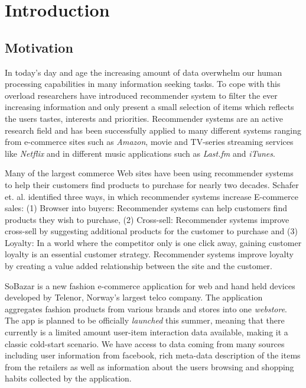 
\chapter{Introduction}
\minitoc
\setcounter{page}{1}

\clearpage

\section{Motivation}


In today's day and age the increasing amount of data overwhelm our human processing capabilities in many information seeking tasks. To cope with this overload researchers have introduced recommender system to filter the ever increasing information and only present a small selection of items which reflects the users tastes, interests and priorities. Recommender systems are an active research field and has been successfully applied to many different systems ranging from e-commerce sites such as \emph{Amazon}, movie and TV-series streaming services like \emph{Netflix} and in different music applications such as \emph{Last.fm} and \emph{iTunes}.

Many of the largest commerce Web sites have been using recommender systems to help their customers find products to purchase for nearly two decades.
Schafer et. al. \cite{Schafer1999} identified three ways, in which recommender systems increase E-commerce sales: (1) Browser into buyers: Recommender systems can help customers find products they wish to purchase, (2) Cross-sell: Recommender systems improve cross-sell by suggesting additional products for the customer to purchase and (3) Loyalty: In a world where the competitor only is one click away, gaining customer loyalty is an essential customer strategy. Recommender systems improve loyalty by creating a value added relationship between the site and the customer.

SoBazar is a new fashion e-commerce application for web and hand held devices developed by Telenor, Norway's largest telco company. The application aggregates fashion products from various brands and stores into one \emph{webstore}. The app is planned to be officially \emph{launched} this summer, meaning that there currently is a limited amount user-item interaction data available, making it a classic cold-start scenario. We have access to data coming from many sources including user information from facebook, rich meta-data description of the items from the retailers as well as information about the users browsing and shopping habits collected by the application.

